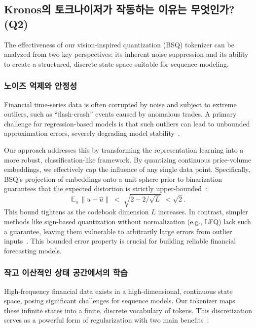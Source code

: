 \subsection{Kronos의 토크나이저가 작동하는 이유는 무엇인가? (Q2)}

The effectiveness of our vision-inspired quantization (BSQ) tokenizer can be analyzed from two key perspectives: its inherent noise suppression and its ability to create a structured, discrete state space suitable for sequence modeling.

\subsubsection{노이즈 억제와 안정성}
Financial time-series data is often corrupted by noise and subject to extreme outliers, such as ``flash-crash'' events caused by anomalous trades. A primary challenge for regression-based models is that such outliers can lead to unbounded approximation errors, severely degrading model stability~\cite{brownlees2006financial}.

Our approach addresses this by transforming the representation learning into a more robust, classification-like framework. By quantizing continuous price-volume embeddings, we effectively cap the influence of any single data point. Specifically, BSQ's projection of embeddings onto a unit sphere prior to binarization guarantees that the expected distortion is strictly upper-bounded~\cite{zhao2024image}:
\[
  \mathbb{E}_u \,\big\|u - \widehat u\big\|\;<\;\sqrt{2 - 2/\sqrt{L}}\;<\sqrt{2}.
\]
This bound tightens as the codebook dimension \(L\) increases. In contrast, simpler methods like sign-based quantization without normalization (e.g., LFQ) lack such a guarantee, leaving them vulnerable to arbitrarily large errors from outlier inputs~\cite{zhao2024image}. This bounded error property is crucial for building reliable financial forecasting models.

\subsubsection{작고 이산적인 상태 공간에서의 학습}
High-frequency financial data exists in a high-dimensional, continuous state space, posing significant challenges for sequence models. Our tokenizer maps these infinite states into a finite, discrete vocabulary of tokens. This discretization serves as a powerful form of regularization with two main benefits~\cite{rabanser2020effectiveness}:

